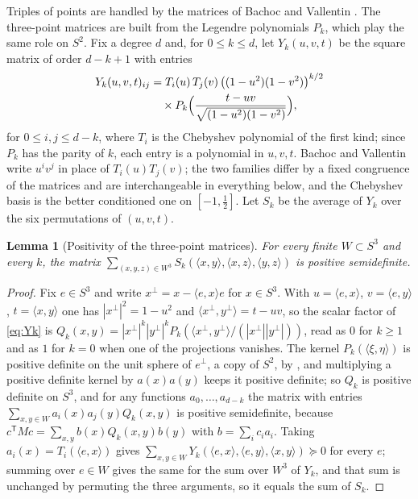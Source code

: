 \documentclass[11pt,reqno]{amsart}
\renewcommand{\_}{\origunderscore\allowbreak}
\numberwithin{equation}{section}
\theoremstyle{plain}
\newtheorem{lem}[thm]{Lemma}
\theoremstyle{definition}
\theoremstyle{remark}
\begin{document}
Triples of points are handled by the matrices of Bachoc and Vallentin
\cite{BV08}. The three-point matrices are built from the Legendre
polynomials $P_k$, which play the same role on $S^2$. Fix a degree $d$
and, for $0\le k\le d$, let $Y_k(u,v,t)$ be the square matrix of order
$d-k+1$ with entries
\begin{equation}\label{eq:Yk}
\begin{aligned}
  Y_k(u,v,t)_{ij}&=T_i(u)\,T_j(v)\,
  \bigl((1-u^2)(1-v^2)\bigr)^{k/2}\\
  &\quad\times P_k\Bigl(\frac{t-uv}{\sqrt{(1-u^2)(1-v^2)}}\Bigr),
\end{aligned}
\end{equation}
for $0\le i,j\le d-k$,
where $T_i$ is the Chebyshev polynomial of the first kind; since $P_k$
has the parity of $k$, each entry is a polynomial in $u,v,t$. Bachoc
and Vallentin write $u^iv^j$ in place of $T_i(u)T_j(v)$; the two
families differ by a fixed congruence of the matrices and are
interchangeable in everything below, and the Chebyshev basis is the
better conditioned one on $[-1,\tfrac12]$. Let $S_k$ be the average of
$Y_k$ over the six permutations of $(u,v,t)$.

\begin{lem}[Positivity of the three-point matrices]\label{lem:three-point-psd}
For every finite $W\subset S^3$ and every $k$, the matrix
$\sum_{(x,y,z)\in W^3}S_k(\langle x,y\rangle,\langle x,z\rangle,\langle y,z\rangle)$
is positive semidefinite.
\end{lem}

\begin{proof}
Fix $e\in S^3$ and write $x^\perp=x-\langle e,x\rangle e$ for $x\in S^3$.
With $u=\langle e,x\rangle$, $v=\langle e,y\rangle$, $t=\langle x,y\rangle$
one has $|x^\perp|^2=1-u^2$ and $\langle x^\perp,y^\perp\rangle=t-uv$, so
the scalar factor of \eqref{eq:Yk} is
$Q_k(x,y)=|x^\perp|^k|y^\perp|^kP_k(\langle x^\perp,y^\perp\rangle/(|x^\perp||y^\perp|))$,
read as $0$ for $k\ge1$ and as $1$ for $k=0$ when one of the projections
vanishes. The kernel $P_k(\langle\xi,\eta\rangle)$ is positive definite
on the unit sphere of $e^\perp$, a copy of $S^2$, by \cite{Sch42}, and
multiplying a positive definite kernel by $a(x)a(y)$ keeps it positive
definite; so $Q_k$ is positive definite on $S^3$, and for any functions
$a_0,\dots,a_{d-k}$ the matrix with entries
$\sum_{x,y\in W}a_i(x)a_j(y)Q_k(x,y)$ is positive semidefinite, because
$c^{\mathsf T}Mc=\sum_{x,y}b(x)Q_k(x,y)b(y)$ with $b=\sum_ic_ia_i$. Taking
$a_i(x)=T_i(\langle e,x\rangle)$ gives
$\sum_{x,y\in W}Y_k(\langle e,x\rangle,\langle e,y\rangle,\langle x,y\rangle)\succeq0$
for every $e$; summing over $e\in W$ gives the same for the sum over
$W^3$ of $Y_k$, and that sum is unchanged by permuting the three
arguments, so it equals the sum of $S_k$.
\end{proof}
\end{document}
